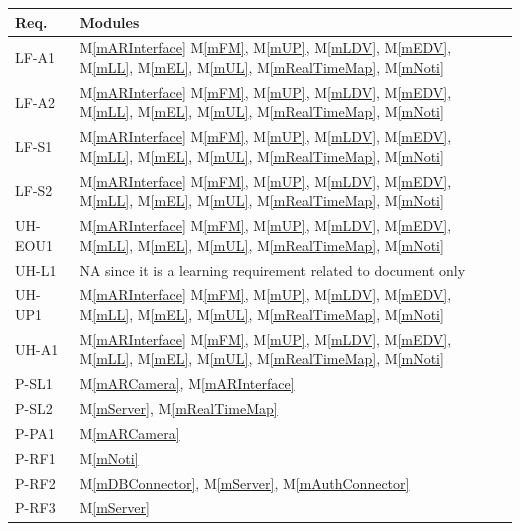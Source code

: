 \documentclass[12pt, titlepage]{article}
\newcommand{\mref}[1]{M\ref{#1}}
\begin{document}
\begin{table}[H]
\centering
\begin{tabular}{p{} p{}}
\toprule
\textbf{Req.} & \textbf{Modules}\\
\midrule
LF-A1 & \mref{mARInterface} \mref{mFM}, \mref{mUP}, \mref{mLDV}, \mref{mEDV}, \mref{mLL}, \mref{mEL}, \mref{mUL}, \mref{mRealTimeMap}, \mref{mNoti}\\
LF-A2 & \mref{mARInterface} \mref{mFM}, \mref{mUP}, \mref{mLDV}, \mref{mEDV}, \mref{mLL}, \mref{mEL}, \mref{mUL}, \mref{mRealTimeMap}, \mref{mNoti}\\
LF-S1 & \mref{mARInterface} \mref{mFM}, \mref{mUP}, \mref{mLDV}, \mref{mEDV}, \mref{mLL}, \mref{mEL}, \mref{mUL}, \mref{mRealTimeMap}, \mref{mNoti}\\
LF-S2 & \mref{mARInterface} \mref{mFM}, \mref{mUP}, \mref{mLDV}, \mref{mEDV}, \mref{mLL}, \mref{mEL}, \mref{mUL}, \mref{mRealTimeMap}, \mref{mNoti}\\
UH-EOU1 & \mref{mARInterface} \mref{mFM}, \mref{mUP}, \mref{mLDV}, \mref{mEDV}, \mref{mLL}, \mref{mEL}, \mref{mUL}, \mref{mRealTimeMap}, \mref{mNoti}\\
UH-L1 & NA since it is a learning requirement related to document only\\
UH-UP1 & \mref{mARInterface} \mref{mFM}, \mref{mUP}, \mref{mLDV}, \mref{mEDV}, \mref{mLL}, \mref{mEL}, \mref{mUL}, \mref{mRealTimeMap}, \mref{mNoti}\\
UH-A1 & \mref{mARInterface} \mref{mFM}, \mref{mUP}, \mref{mLDV}, \mref{mEDV}, \mref{mLL}, \mref{mEL}, \mref{mUL}, \mref{mRealTimeMap}, \mref{mNoti}\\
P-SL1 & \mref{mARCamera}, \mref{mARInterface}\\
P-SL2 & \mref{mServer}, \mref{mRealTimeMap}\\
P-PA1 & \mref{mARCamera}\\
P-RF1 & \mref{mNoti}\\
P-RF2 & \mref{mDBConnector}, \mref{mServer}, \mref{mAuthConnector}\\
P-RF3 & \mref{mServer}\\

\end{tabular}
\end{table}
\end{document}
